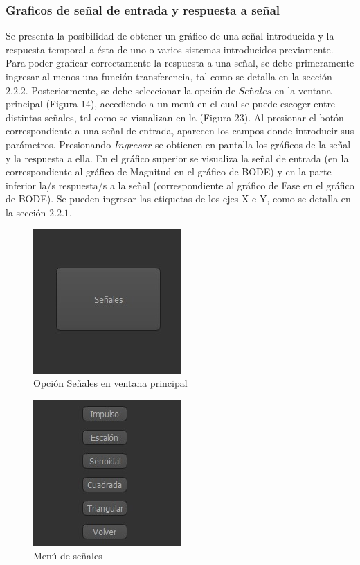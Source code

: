 \subsubsection{Graficos de señal de entrada y respuesta a señal}

Se presenta la posibilidad de obtener un gráfico de una señal introducida y la respuesta temporal a ésta de uno o varios sistemas introducidos previamente.
Para poder graficar correctamente la respuesta a una señal, se debe primeramente ingresar al menos una función transferencia, tal como se detalla en la sección $2.2.2$. Posteriormente, se debe seleccionar la opción de $Señales$ en la ventana principal (Figura 14), accediendo a un menú en el cual se puede escoger entre distintas señales, tal como se visualizan en la (Figura 23). Al presionar el botón correspondiente a una señal de entrada, aparecen los campos donde introducir sus parámetros. Presionando $Ingresar$ se obtienen en pantalla los gráficos de la señal y la respuesta a ella. En el gráfico superior se visualiza la señal de entrada (en la correspondiente al gráfico de Magnitud en el gráfico de BODE) y en la parte inferior la/s respuesta/s a la señal (correspondiente al gráfico de Fase en el gráfico de BODE). Se pueden ingresar las etiquetas de los ejes X e Y, como se detalla en la sección $2.2.1$.

\begin{figure}[!htb] 
    \centering 
    \includegraphics  [scale=0.8]{../EJ2/LatexScreenshots/signalsoption.png} 
    \caption{Opción Señales en ventana principal}
    \label{fig:signalsoption}
\end{figure}

\begin{figure}[!htb] 
    \centering 
    \includegraphics  [scale=0.8]{../EJ2/LatexScreenshots/signalsmenu.png} 
    \caption{Menú de señales}
    \label{fig:signalsmenu}
\end{figure}

